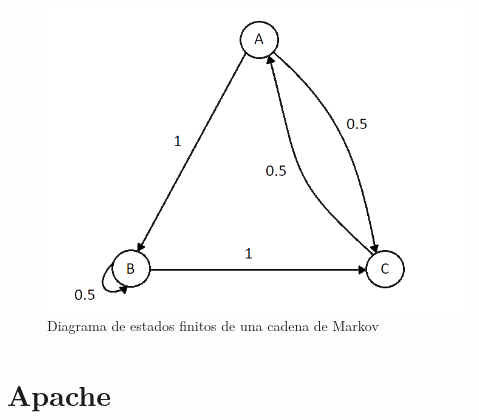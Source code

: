 \documentclass[12pt, a4paper, titlepage]{report}
\begin{document}
		\begin{figure}[H]
			\includegraphics[width=12cm]{./imagenes/MarcoTeorico/Markov/CMarkov.png}
			\centering 
			\caption{Diagrama de estados finitos de una cadena de Markov \cite{refMarkov}}
		\end{figure}

	    \section{Apache}
	    
\end{document}
